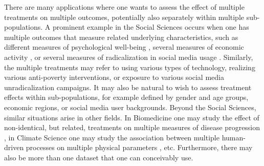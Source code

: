 \documentclass[pdflatex,sn-mathphys-num]{sn-jnl}%
\theoremstyle{thmstyleone}%
\theoremstyle{thmstyletwo}%
\theoremstyle{thmstylethree}%
\begin{document}
There are many applications where one wants to assess the effect of multiple treatments on multiple outcomes, potentially also separately within multiple sub-populations.
A prominent example in the Social Sciences occurs when one has multiple outcomes that measure related underlying characteristics, such as different measures of psychological well-being \citep{orben:2019}, several measures of economic activity \citep{banerjee_abhijit:2015}, or several measures of radicalization in social media usage \citep{bail:2018}.
Similarly, the multiple treatments may refer to using various types of technology, realizing various anti-poverty interventions, or exposure to various social media unradicalization campaigns.
It may also be natural to wish to assess treatment effects within sub-populations, for example defined by gender and age groups, economic regions, or social media user backgrounds.
Beyond the Social Sciences, similar situations arise in other fields. In Biomedicine one may study the effect of non-identical, but related, treatments on multiple measures of disease progression \citep{pocock:1987}, in Climate Science one may study the association between multiple human-driven processes on multiple physical parameters \citep{knutti:2010}, etc.
\color{blue} Furthermore, there may also be more than one dataset that one can conceivably use. \color{black}
\end{document}
